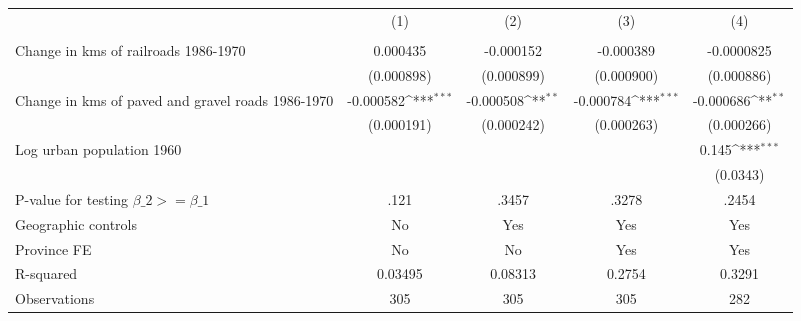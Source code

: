 {
\def\sym#1{\ifmmode^{#1}\else\(^{#1}\)\fi}
\begin{tabular}{l*{4}{c}}
\hline\hline
                &\multicolumn{1}{c}{(1)}&\multicolumn{1}{c}{(2)}&\multicolumn{1}{c}{(3)}&\multicolumn{1}{c}{(4)}\\
                &\multicolumn{1}{c}{}&\multicolumn{1}{c}{}&\multicolumn{1}{c}{}&\multicolumn{1}{c}{}\\
\hline
Change in kms of railroads 1986-1970& 0.000435         &-0.000152         &-0.000389         &-0.0000825         \\
                &(0.000898)         &(0.000899)         &(0.000900)         &(0.000886)         \\
[1em]
Change in kms of paved and gravel roads 1986-1970&-0.000582\sym{***}&-0.000508\sym{**} &-0.000784\sym{***}&-0.000686\sym{**} \\
                &(0.000191)         &(0.000242)         &(0.000263)         &(0.000266)         \\
[1em]
Log urban population 1960&                  &                  &                  &    0.145\sym{***}\\
                &                  &                  &                  & (0.0343)         \\
\hline
P-value for testing $\beta\_{2} >= \beta\_{1}$&     .121         &    .3457         &    .3278         &    .2454         \\
Geographic controls&       No         &      Yes         &      Yes         &      Yes         \\
Province FE     &       No         &       No         &      Yes         &      Yes         \\
R-squared       &  0.03495         &  0.08313         &   0.2754         &   0.3291         \\
Observations    &      305         &      305         &      305         &      282         \\
\hline\hline
\end{tabular}
}

